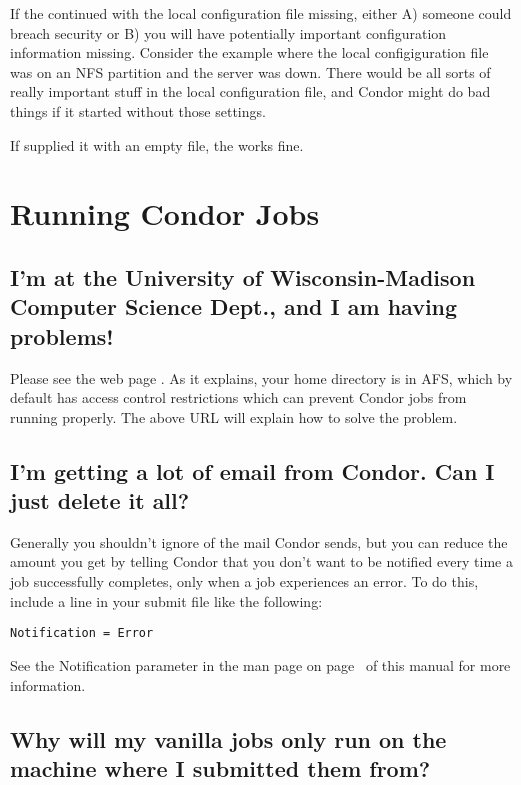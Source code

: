 If the  continued with the local configuration file
missing, either A) someone could breach security or B) you will have
potentially important configuration information missing.
Consider the example where the local configiguration file was on an NFS
partition and the server was down. 
There would be all sorts of
really important stuff in the local configuration file,
and Condor might do bad things if it started without those settings.  

If supplied it with an empty file, the  works fine.

\section{Running Condor Jobs}

\subsection{I'm at the University of Wisconsin-Madison Computer
Science Dept., and I am having problems!}

Please see the web page .
As
it explains, your home directory is in AFS, which by default has
access control restrictions which can prevent Condor jobs from running
properly.
The above URL will explain how to solve the problem.

\subsection{I'm getting a lot of email from Condor.  Can I just delete it all?}

Generally you shouldn't ignore  of the mail Condor sends,
but you can reduce the amount you get by telling Condor that you don't
want to be notified every time a job successfully completes, only when
a job experiences an error.
To do this, include a line in your submit file like the following:

\begin{verbatim}Notification = Error\end{verbatim}

See the Notification parameter in the  man page on
page~\pageref{man-condor-submit-notification} of this manual for more
information.

\subsection{Why will my vanilla jobs only run on the machine where I
submitted them from?}

